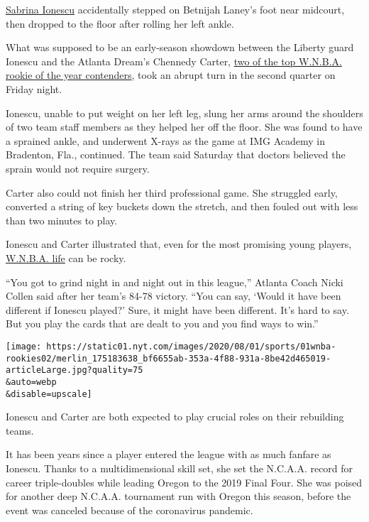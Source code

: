 \href{https://www.nytimes.com/2020/03/28/sports/sabrina-ionescu-oregon-wnba.html}{Sabrina
Ionescu} accidentally stepped on Betnijah Laney's foot near midcourt,
then dropped to the floor after rolling her left ankle.

What was supposed to be an early-season showdown between the Liberty
guard Ionescu and the Atlanta Dream's Chennedy Carter,
\href{https://www.nytimes.com/2020/07/24/sports/basketball/wnba-eastern-conference-preview.html}{two
of the top W.N.B.A. rookie of the year contenders}, took an abrupt turn
in the second quarter on Friday night.

Ionescu, unable to put weight on her left leg, slung her arms around the
shoulders of two team staff members as they helped her off the floor.
She was found to have a sprained ankle, and underwent X-rays as the game
at IMG Academy in Bradenton, Fla., continued. The team said Saturday
that doctors believed the sprain would not require surgery.

Carter also could not finish her third professional game. She struggled
early, converted a string of key buckets down the stretch, and then
fouled out with less than two minutes to play.

Ionescu and Carter illustrated that, even for the most promising young
players,
\href{https://www.nytimes.com/2020/07/23/sports/basketball/wnba-season-preview.html}{W.N.B.A.
life} can be rocky.

``You got to grind night in and night out in this league,'' Atlanta
Coach Nicki Collen said after her team's 84-78 victory. ``You can say,
`Would it have been different if Ionescu played?' Sure, it might have
been different. It's hard to say. But you play the cards that are dealt
to you and you find ways to win.''

\texttt{[image: https://static01.nyt.com/images/2020/08/01/sports/01wnba-rookies02/merlin\_175183638\_bf6655ab-353a-4f88-931a-8be42d465019-articleLarge.jpg?quality=75\\\&auto=webp\\\&disable=upscale]}

Ionescu and Carter are both expected to play crucial roles on their
rebuilding teams.

It has been years since a player entered the league with as much fanfare
as Ionescu. Thanks to a multidimensional skill set, she set the N.C.A.A.
record for career triple-doubles while leading Oregon to the 2019 Final
Four. She was poised for another deep N.C.A.A. tournament run with
Oregon this season, before the event was canceled because of the
coronavirus pandemic.

